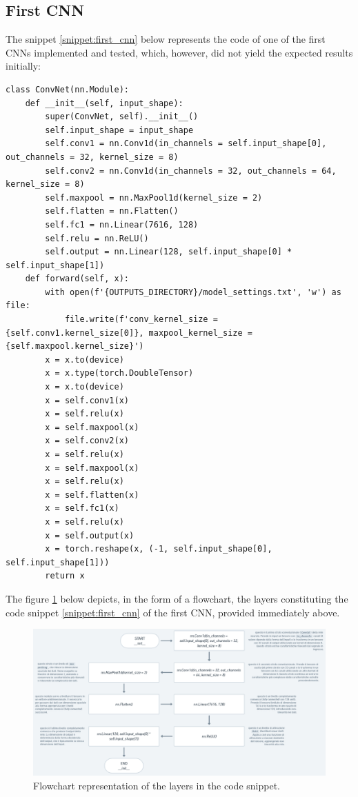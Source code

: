 \documentclass[12pt,english]{report}
\begin{document}
\subsection{First CNN}
\label{subsec:first_cnn}

The snippet \ref{snippet:first_cnn} below represents the code of one of the first CNNs implemented and tested, which, however, did not yield the expected results initially:

\lstset{language=Python}
\begin{lstlisting}[aboveskip=15pt, belowskip=15pt, basicstyle=\fontsize{8}{10}\selectfont, keywordstyle=\color{blue}, breaklines=true, label=snippet:first_cnn]
class ConvNet(nn.Module):
    def __init__(self, input_shape):
        super(ConvNet, self).__init__()
        self.input_shape = input_shape
        self.conv1 = nn.Conv1d(in_channels = self.input_shape[0], out_channels = 32, kernel_size = 8)
        self.conv2 = nn.Conv1d(in_channels = 32, out_channels = 64, kernel_size = 8)
        self.maxpool = nn.MaxPool1d(kernel_size = 2)
        self.flatten = nn.Flatten()
        self.fc1 = nn.Linear(7616, 128)
        self.relu = nn.ReLU()
        self.output = nn.Linear(128, self.input_shape[0] * self.input_shape[1])
    def forward(self, x):
        with open(f'{OUTPUTS_DIRECTORY}/model_settings.txt', 'w') as file:
            file.write(f'conv_kernel_size = {self.conv1.kernel_size[0]}, maxpool_kernel_size = {self.maxpool.kernel_size}')
        x = x.to(device)
        x = x.type(torch.DoubleTensor)
        x = x.to(device)
        x = self.conv1(x)
        x = self.relu(x)
        x = self.maxpool(x)
        x = self.conv2(x)
        x = self.relu(x)
        x = self.maxpool(x)
        x = self.relu(x)
        x = self.flatten(x)
        x = self.fc1(x)
        x = self.relu(x)
        x = self.output(x)
        x = torch.reshape(x, (-1, self.input_shape[0], self.input_shape[1]))
        return x
\end{lstlisting}

The figure \ref{fig:first_cnn_layers} below depicts, in the form of a flowchart, the layers constituting the code snippet \ref{snippet:first_cnn} of the first CNN, provided immediately above.

\begin{figure}[H]
    \centering
    \includegraphics[width=1\textwidth]{images/first_cnn_layers.png}
    \captionsetup{justification=centering}
        \caption{Flowchart representation of the layers in the code snippet.}
    \label{fig:first_cnn_layers}
\end{figure}
\end{document}
